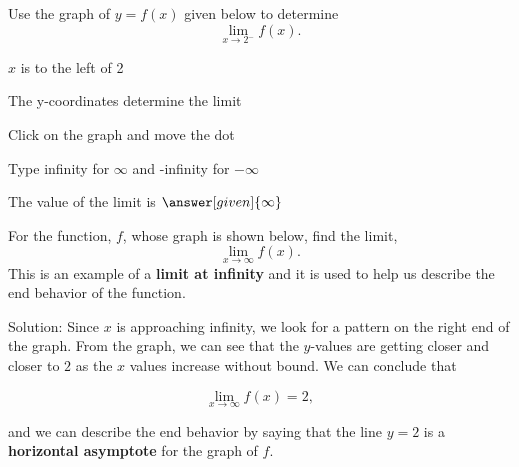 \documentclass{ximera}
\begin{document}
\begin{problem} %

  Use the graph of $y = f(x)$ given below to determine
  \[
  \lim_{x\to 2^-} f(x).
  \]
  
    \begin{hint}
      $x$ is to the left of 2
    \end{hint}
    \begin{hint}
      The y-coordinates determine the limit
    \end{hint}
		\begin{hint}
		  Click on the graph and move the dot
		\end{hint}
		\begin{hint}
		 Type infinity for $\infty$ and -infinity for $-\infty$
		\end{hint}
		The value of the limit is
		 $\answer[given]{\infty}$


	
\end{problem}

\begin{example} %
For the function, $f$, whose graph is shown below, find the limit,
\[
\lim_{x \to \infty}f(x).
\] 
This is an example of a \textbf{limit at infinity} and it is used to help 
us describe the end behavior of the function.




\vspace{.25in}
Solution:  Since $x$ is approaching infinity, we look for a pattern on the right end of the graph.  
From the graph, we can see that the $y$-values are getting closer and closer to $2$ as the $x$ values 
increase without bound. We can conclude that 

\[
\lim_{x \to \infty}f(x) = 2,
\]

and we can describe the end behavior by saying that the line $y = 2$ is a \textbf{horizontal asymptote} for the graph of $f$.


\end{example}
\end{document}
